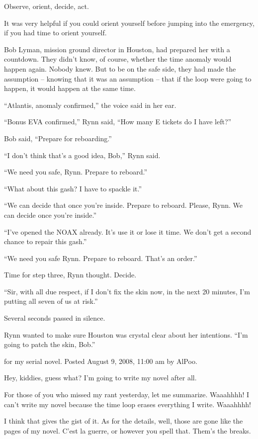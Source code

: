 Observe, orient, decide, act.

It was very helpful if you could orient yourself before jumping into the emergency, if you had time to orient yourself.

Bob Lyman, mission ground director in Houston, had prepared her with a countdown. They didn’t know, of course, whether the time anomaly would happen again. Nobody knew. But to be on the safe side, they had made the assumption – knowing that it was an assumption – that if the loop were going to happen, it would happen at the same time.

“Atlantis, anomaly confirmed,” the voice said in her ear.

“Bonus EVA confirmed,” Rynn said, “How many E tickets do I have left?”

Bob said, “Prepare for reboarding.”

“I don’t think that’s a good idea, Bob,” Rynn said.

“We need you safe, Rynn. Prepare to reboard.”

“What about this gash? I have to spackle it.”

“We can decide that once you’re inside. Prepare to reboard. Please, Rynn. We can decide once you’re inside.”

“I’ve opened the NOAX already. It’s use it or lose it time. We don’t get a second chance to repair this gash.”

“We need you safe Rynn. Prepare to reboard. That’s an order.”

Time for step three, Rynn thought. Decide.

“Sir, with all due respect, if I don’t fix the skin now, in the next 20 minutes, I’m putting all seven of us at risk.”

Several seconds passed in silence.

Rynn wanted to make sure Houston was crystal clear about her intentions. “I’m going to patch the skin, Bob.”




 for my serial novel. Posted August 9, 2008, 11:00 am by AlPoo.

Hey, kiddies, guess what? I’m going to write my novel after all.

For those of you who missed my rant yesterday, let me summarize. Waaahhhh! I can’t write my novel because the time loop erases everything I write. Waaahhhh!

I think that gives the gist of it. As for the details, well, those are gone like the pages of my novel. C’est la guerre, or however you spell that. Them’s the breaks.

